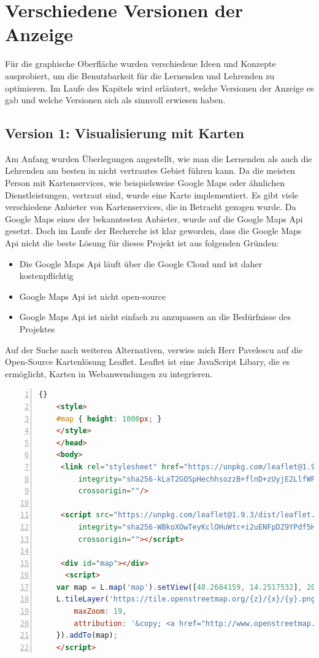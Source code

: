 \section{Verschiedene Versionen der Anzeige}
Für die graphische Oberfläche wurden verschiedene Ideen und Konzepte ausprobiert, um die Benutzbarkeit für die Lernenden und Lehrenden zu optimieren.
Im Laufe des Kapitels wird erläutert, welche Versionen der Anzeige es gab und welche Versionen sich als sinnvoll erwiesen haben.

\subsection{Version 1: Visualisierung mit Karten}
Am Anfang wurden Überlegungen angestellt, wie man die Lernenden als auch die Lehrenden am besten in nicht vertrautes Gebiet führen kann.
Da die meisten Person mit Kartenservices, wie beispielsweise Google Maps oder ähnlichen Dienstleistungen, vertraut sind, wurde eine Karte implementiert.
Es gibt viele verschiedene Anbieter von Kartenservices, die in Betracht gezogen wurde. 
Da Google Maps eines der bekanntesten Anbieter, wurde auf die Google Maps Api gesetzt. 
Doch im Laufe der Recherche ist klar geworden, dass die Google Maps Api nicht die beste Lösung für dieses Projekt ist  aus folgenden Gründen: \cite{Ashraf}
\begin{itemize}
    \item Die Google Maps Api läuft über die Google Cloud und ist daher kostenpflichtig
    \item Google Maps Api ist nicht open-source
    \item Google Maps Api ist nicht einfach zu anzupassen an die Bedürfnisse des Projektes 
\end{itemize}


Auf der Suche nach weiteren Alternativen, verwies mich Herr Pavelescu auf die Open-Source Kartenlösung Leaflet.
Leaflet ist eine JavaScript Libary, die es ermöglicht, Karten in Webanwendungen zu integrieren. \cite{Agafonkin} 


\pagebreak

\begin{lstlisting}[numbers=left,language=HTML,caption={Implementierung einer Karte mit Leaflet},label={lst:leafletmap}]{}
    <style>
    #map { height: 1000px; }
    </style>
    </head>
    <body>
     <link rel="stylesheet" href="https://unpkg.com/leaflet@1.9.3/dist/leaflet.css"
         integrity="sha256-kLaT2GOSpHechhsozzB+flnD+zUyjE2LlfWPgU04xyI="
         crossorigin=""/>
    
     <script src="https://unpkg.com/leaflet@1.9.3/dist/leaflet.js"
         integrity="sha256-WBkoXOwTeyKclOHuWtc+i2uENFpDZ9YPdf5Hf+D7ewM="
         crossorigin=""></script>
    
     <div id="map"></div>
      <script>
    var map = L.map('map').setView([48.2684159, 14.2517532], 20);
    L.tileLayer('https://tile.openstreetmap.org/{z}/{x}/{y}.png', {
        maxZoom: 19,
        attribution: '&copy; <a href="http://www.openstreetmap.org/copyright">OpenStreetMap</a>'
    }).addTo(map);
    </script> 
\end{lstlisting}

